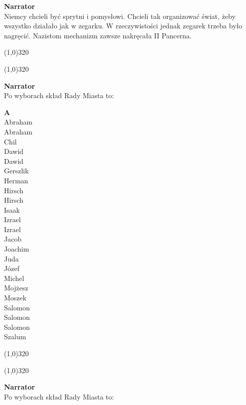 \documentclass[11pt,a4paper,oneside]{article}
\begin{document}
\textbf{Narrator}\\
Niemcy chcieli być sprytni i pomysłowi. Chcieli tak organizować świat, 
żeby wszystko działało jak w zegarku. W rzeczywistości jednak zegarek
trzeba było nagręcić. Nazistom mechanizm zawsze nakręcała II Pancerna. 

\line(1,0){320}

\newpage
\line(1,0){320}

\textbf{Narrator}\\
Po wyborach skład Rady Miasta to:

\textbf{A}\\
Abraham\\
Abraham\\
Chil\\
Dawid\\
Dawid\\
Gerszlik\\
Herman\\
Hirsch\\
Hirsch\\
Isaak\\
Izrael\\
Izrael\\
Jacob\\
Joachim\\
Juda\\
Józef\\
Michel\\
Mojżesz\\
Moszek\\
Salomon\\
Salomon\\
Salomon\\
Szalum

\line(1,0){320}

\newpage
\line(1,0){320}

\textbf{Narrator}\\
Po wyborach skład Rady Miasta to:
\end{document}
